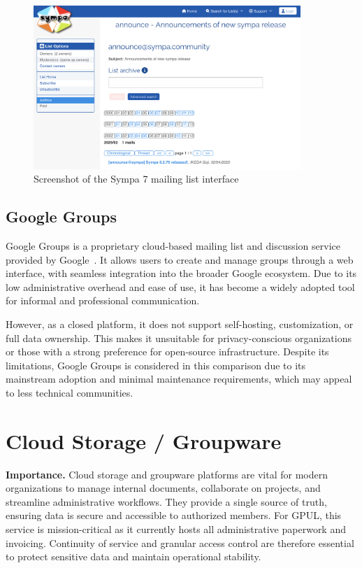 \begin{figure}[h!]
  \centering
  \includegraphics[width=0.9\textwidth]{imaxes/sympa.png}
  \caption{Screenshot of the Sympa 7 mailing list interface}
  \label{fig:sympa}
\end{figure}

\subsection*{Google Groups}

Google Groups is a proprietary cloud-based mailing list and discussion service provided by Google~\cite{google-groups-docs}. It allows users to create and manage groups through a web interface, with seamless integration into the broader Google ecosystem. Due to its low administrative overhead and ease of use, it has become a widely adopted tool for informal and professional communication.

However, as a closed platform, it does not support self-hosting, customization, or full data ownership. This makes it unsuitable for privacy-conscious organizations or those with a strong preference for open-source infrastructure. Despite its limitations, Google Groups is considered in this comparison due to its mainstream adoption and minimal maintenance requirements, which may appeal to less technical communities.

\section{Cloud Storage / Groupware}

\textbf{Importance.} Cloud storage and groupware platforms are vital for modern organizations to manage internal documents, collaborate on projects, and streamline administrative workflows. They provide a single source of truth, ensuring data is secure and accessible to authorized members. For GPUL, this service is mission-critical as it currently hosts all administrative paperwork and invoicing. Continuity of service and granular access control are therefore essential to protect sensitive data and maintain operational stability.

